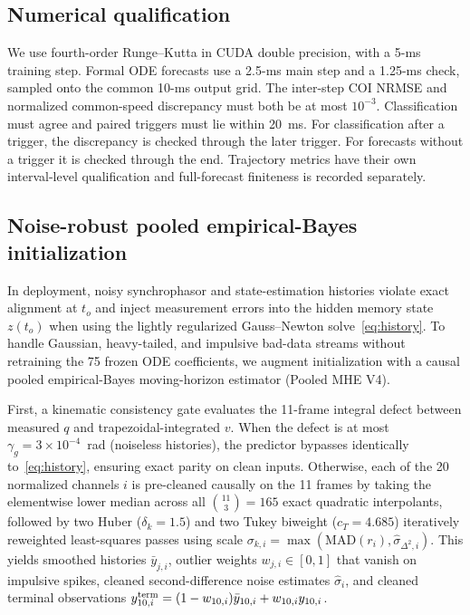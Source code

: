 \documentclass[journal]{IEEEtran}
\begin{document}
\subsection{Numerical qualification}
We use fourth-order Runge--Kutta in CUDA double precision, with a
5-ms training step. Formal ODE forecasts use a 2.5-ms main step and
a 1.25-ms check, sampled onto the common 10-ms output grid. The
inter-step COI NRMSE and normalized common-speed discrepancy must both
be at most \(10^{-3}\). Classification must agree and paired triggers
must lie within 20~ms. For classification after a trigger, the discrepancy
is checked through the later trigger. For forecasts without a trigger it is
checked through the end. Trajectory metrics have their own interval-level
qualification and full-forecast finiteness is recorded separately.

\subsection{Noise-robust pooled empirical-Bayes initialization}
\label{sec:robust_init}
In deployment, noisy synchrophasor and state-estimation histories violate
exact alignment at \(t_o\) and inject measurement errors into the hidden
memory state \(z(t_o)\) when using the lightly regularized Gauss--Newton
solve~\eqref{eq:history}. To handle Gaussian, heavy-tailed, and impulsive
bad-data streams without retraining the 75 frozen ODE coefficients, we
augment initialization with a causal pooled empirical-Bayes moving-horizon
estimator (Pooled MHE V4).

First, a kinematic consistency gate evaluates the 11-frame integral defect
between measured \(q\) and trapezoidal-integrated \(v\). When the defect is
at most \(\gamma_g=3\times10^{-4}\)~rad (noiseless histories), the predictor
bypasses identically to~\eqref{eq:history}, ensuring exact parity on clean
inputs. Otherwise, each of the 20 normalized channels \(i\) is pre-cleaned
causally on the 11 frames by taking the elementwise lower median across all
\(\binom{11}{3}=165\) exact quadratic interpolants, followed by two Huber
(\(\delta_k=1.5\)) and two Tukey biweight (\(c_T=4.685\)) iteratively
reweighted least-squares passes using scale
\(\sigma_{k,i}=\max(\mathrm{MAD}(r_i),\hat\sigma_{\Delta^2,i})\). This yields
smoothed histories \(\bar y_{j,i}\), outlier weights \(w_{j,i}\in[0,1]\) that
vanish on impulsive spikes, cleaned second-difference noise estimates
\(\hat\sigma_i\), and cleaned terminal observations
\(y^{\rm term}_{10,i}=(1-w_{10,i})\bar y_{10,i}+w_{10,i}y_{10,i}\).
\end{document}
